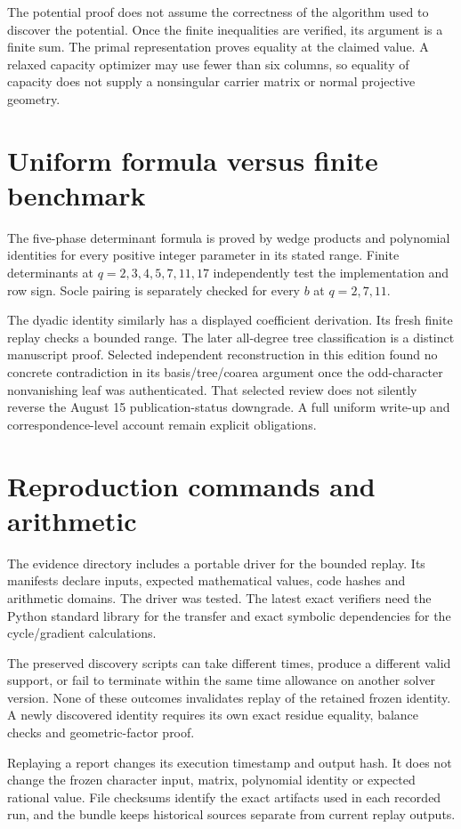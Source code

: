 The potential proof does not assume the correctness of the algorithm used to discover the potential. Once the finite inequalities are verified, its argument is a finite sum. The primal representation proves equality at the claimed value. A relaxed capacity optimizer may use fewer than six columns, so equality of capacity does not supply a nonsingular carrier matrix or normal projective geometry.

\section{Uniform formula versus finite benchmark}
The five-phase determinant formula is proved by wedge products and polynomial identities for every positive integer parameter in its stated range. Finite determinants at $q=2,3,4,5,7,11,17$ independently test the implementation and row sign. Socle pairing is separately checked for every $b$ at $q=2,7,11$.

The dyadic identity similarly has a displayed coefficient derivation. Its fresh finite replay checks a bounded range. The later all-degree tree classification is a distinct manuscript proof. Selected independent reconstruction in this edition found no concrete contradiction in its basis/tree/coarea argument once the odd-character nonvanishing leaf was authenticated. That selected review does not silently reverse the August 15 publication-status downgrade. A full uniform write-up and correspondence-level account remain explicit obligations.

\section{Reproduction commands and arithmetic}
The evidence directory includes a portable driver for the bounded replay. Its manifests declare inputs, expected mathematical values, code hashes and arithmetic domains. The driver was tested. The latest exact verifiers need the Python standard library for the transfer and exact symbolic dependencies for the cycle/gradient calculations.

The preserved discovery scripts can take different times, produce a different valid support, or fail to terminate within the same time allowance on another solver version. None of these outcomes invalidates replay of the retained frozen identity. A newly discovered identity requires its own exact residue equality, balance checks and geometric-factor proof.

Replaying a report changes its execution timestamp and output hash. It does not change the frozen character input, matrix, polynomial identity or expected rational value. File checksums identify the exact artifacts used in each recorded run, and the bundle keeps historical sources separate from current replay outputs.

